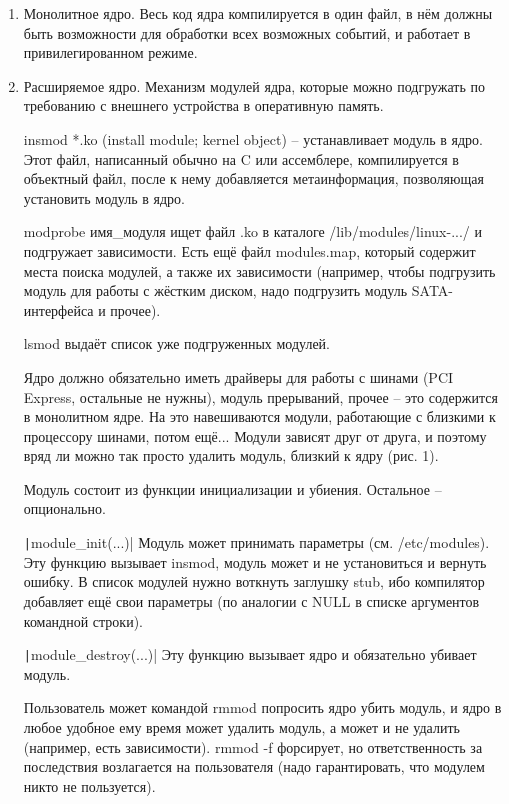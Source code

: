 \documentclass[a4paper,10pt]{article}
\newcommand{\ci}{\texttt}
\begin{document}
\begin{enumerate}
\item Монолитное ядро. Весь код ядра компилируется в один файл, в нём должны быть возможности для обработки всех возможных событий, и работает в привилегированном режиме.
\item Расширяемое ядро. Механизм модулей ядра, которые можно подгружать по требованию с внешнего устройства в оперативную память.

insmod *.ko (install module; kernel object) -- устанавливает модуль в ядро.
Этот файл, написанный обычно на C или ассемблере, компилируется в объектный файл, после к нему добавляется метаинформация, позволяющая установить модуль в ядро.

modprobe имя\_модуля ищет файл .ko в каталоге /lib/modules/linux-.../ и подгружает зависимости. Есть ещё файл modules.map, который содержит места поиска модулей, а также их зависимости (например, чтобы подгрузить модуль для работы с жёстким диском, надо подгрузить модуль SATA-интерфейса и прочее).

lsmod выдаёт список уже подгруженных модулей.

Ядро должно обязательно иметь драйверы для работы с шинами (PCI Express, остальные не нужны), модуль прерываний, прочее -- это содержится в монолитном ядре. На это навешиваются модули, работающие с близкими к процессору шинами, потом ещё... Модули зависят друг от друга, и поэтому вряд ли можно так просто удалить модуль, близкий к ядру (рис. 1).

Модуль состоит из функции инициализации и убиения. Остальное -- опционально.

\ci|module_init(...)| 
Модуль может принимать параметры (см. /etc/modules). Эту функцию вызывает insmod, модуль может и не установиться и вернуть ошибку.
В список модулей нужно воткнуть заглушку stub, ибо компилятор добавляет ещё свои параметры (по аналогии с NULL в списке аргументов командной строки).

\ci|module_destroy(...)| 
Эту функцию вызывает ядро и обязательно убивает модуль. 

Пользователь может командой rmmod попросить ядро убить модуль, и ядро в любое удобное ему время может удалить модуль, а может и не удалить (например, есть зависимости). rmmod -f форсирует, но ответственность за последствия возлагается на пользователя (надо гарантировать, что модулем никто не пользуется).


\end{enumerate}
\end{document}
